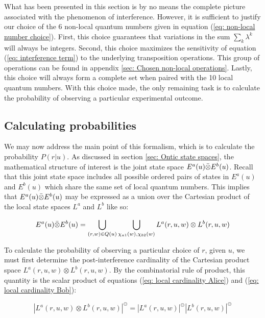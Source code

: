 \documentclass{article}
\begin{document}
What has been presented in this section is by no means the complete picture associated with the phenomenon of interference. However, it is sufficient to justify our choice of the 6 non-local quantum numbers given in equation (\ref{eq: non-local number choice}). First, this choice guarantees that variations in the sum $\sum_{k}\lambda^k$ will always be integers. Second, this choice maximizes the sensitivity of equation (\ref{eq: interference term}) to the underlying transposition operations. This group of operations can be found in appendix \ref{sec: Chosen non-local operations}. Lastly, this choice will always form a complete set when paired with the 10 local quantum numbers. With this choice made, the only remaining task is to calculate the probability of observing a particular experimental outcome. 

\subsection{Calculating probabilities \label{sec: Calculating probabilities}}

We may now address the main point of this formalism, which is to calculate the probability $P(r|u)$. As discussed in section \ref{sec: Ontic state spaces}, the mathematical structure of interest is the joint state space $E^{a}(u)\Bar{\otimes}E^{b}(u)$. Recall that this joint state space includes all possible ordered pairs of states in $E^a(u)$ and $E^b(u)$ which share the same set of local quantum numbers. This implies that $E^{a}(u)\Bar{\otimes}E^{b}(u)$ may be expressed as a union over the Cartesian product of the local state spaces $L^a$ and $L^b$ like so:

\begin{equation}
    E^{a}(u)\Bar{\otimes}E^{b}(u)=\bigcup_{(r,w)\in Q(u)}\bigcup_{\chi_{a1}(w),\chi_{b2}(w)}L^a(r,u,w)\otimes L^b(r,u,w)
    \label{eq: joint state space}
\end{equation}

To calculate the probability of observing a particular choice of $r$, given $u$, we must first determine the post-interference cardinality of the Cartesian product space $L^a(r,u,w)\otimes L^b(r,u,w)$. By the combinatorial rule of product, this quantity is the scalar product of equations (\ref{eq: local cardinality Alice}) and (\ref{eq: local cardinality Bob}):

\begin{equation}
|L^a(r,u,w)\otimes L^b(r,u,w)|^\circleddash=|L^a(r,u,w)|^\circleddash|L^b(r,u,w)|^\circleddash
\label{eq: local product space cardinality}
\end{equation}
\end{document}
